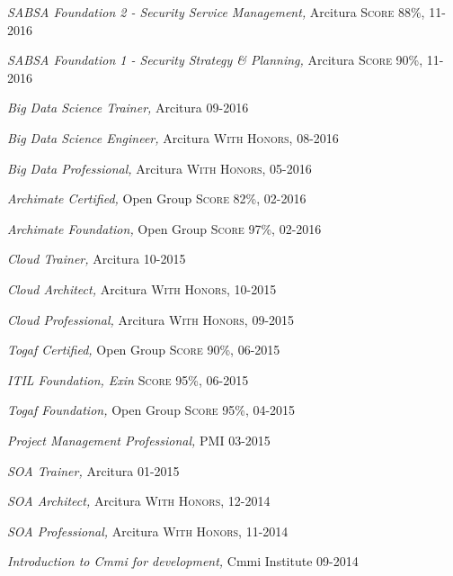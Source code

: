 \documentclass[10pt,a4paper]{article}
\begin{document}
\spacedhrule{-0.2em}{-0.4em}


\headedsection
  {{\sl \textit {SABSA Foundation 2 - Security Service Management},} Arcitura }
  {\textsc{Score 88\%, 11-2016}} 
  
\headedsection
  {{\sl \textit {SABSA Foundation 1 -  Security Strategy & Planning},} Arcitura }
  {\textsc{Score 90\%, 11-2016}} 
  
\headedsection
  {{\sl \textit {Big Data Science Trainer},} Arcitura }
  {\textsc{09-2016}} 
  
\headedsection
  {{\sl \textit {Big Data Science Engineer},} Arcitura }
  {\textsc{With Honors, 08-2016}} 

\headedsection
  {{\sl \textit {Big Data Professional},} Arcitura }
  {\textsc{With Honors, 05-2016}} 

\headedsection
  {{\sl \textit {Archimate Certified},} Open Group}
  {\textsc{Score 82\%, 02-2016}}

\headedsection
  {{\sl \textit {Archimate Foundation},} Open Group}
  {\textsc{Score 97\%, 02-2016}}
  
\headedsection
  {{\sl \textit {Cloud Trainer},} Arcitura}
  {\textsc{ 10-2015}}  

\headedsection
  {{\sl \textit {Cloud Architect},} Arcitura }
  {\textsc{With Honors, 10-2015}} 

\headedsection
  {{\sl \textit {Cloud Professional},} Arcitura }
  {\textsc{With Honors, 09-2015}} 


\headedsection
  {{\sl \textit {Togaf Certified},} Open Group}
  {\textsc{Score 90\%, 06-2015}} 

\headedsection
  {\sl \textit{ITIL Foundation}, Exin}
  {\textsc{Score 95\%, 06-2015}}   
  
\headedsection
  {{\sl \textit {Togaf Foundation},} Open Group}
  {\textsc{Score 95\%, 04-2015}}     

\headedsection
  {{\sl \textit {Project Management Professional},} PMI}
  {\textsc{03-2015}} 

\headedsection
  {{\sl \textit {SOA Trainer},} Arcitura}
  {\textsc{01-2015}}  

\headedsection
  {{\sl \textit {SOA Architect},} Arcitura}
  {\textsc{With Honors, 12-2014}}  

\headedsection
  {{\sl \textit {SOA Professional},} Arcitura}
  {\textsc{With Honors, 11-2014}} 
 

\headedsection
  {{\sl \textit {Introduction to Cmmi for development},}  Cmmi Institute}
  {\textsc{ 09-2014}} 
  
\end{document}

